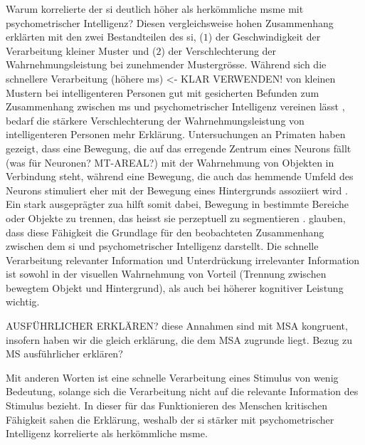 \documentclass[11pt, twoside, a4paper]{book}		%
\begin{document}
Warum korrelierte der \gls{si} deutlich höher \citep[$r~=~.64$ und $r~=~.71$;][]{Melnick2013} als herkömmliche \gls{msm}e \citep[$r~=~-.24$;][]{Sheppard2008} mit psychometrischer Intelligenz? Diesen vergleichsweise hohen Zusammenhang erklärten \citet{Melnick2013} mit den zwei Bestandteilen des \gls{si}, ($1$) der Geschwindigkeit der Verarbeitung kleiner Muster und ($2$) der Verschlechterung der Wahrnehmungsleistung bei zunehmender Mustergrösse. Während sich die schnellere Verarbeitung (höhere \gls{ms}) <- KLAR VERWENDEN! von kleinen Mustern bei intelligenteren Personen gut mit gesicherten Befunden zum Zusammenhang zwischen \gls{ms} und psychometrischer Intelligenz vereinen lässt \citep[][]{Sheppard2008}, bedarf die stärkere Verschlechterung der Wahrnehmungsleistung von intelligenteren Personen mehr Erklärung. Untersuchungen an Primaten haben gezeigt, dass eine Bewegung, die auf das erregende Zentrum eines Neurons fällt (was für Neuronen? MT-AREAL?) mit der Wahrnehmung von Objekten in Verbindung steht, während eine Bewegung, die auch das hemmende Umfeld des Neurons stimuliert eher mit der Bewegung eines Hintergrunds assoziiert wird \citep{Born2000, Churan2008, Regan2000}. Ein stark ausgeprägter \gls{zua} hilft somit dabei, Bewegung in bestimmte Bereiche oder Objekte zu trennen, das heisst sie perzeptuell zu segmentieren \citep{Braddick1993}. \citeauthor{Melnick2013} glauben, dass diese Fähigkeit die Grundlage für den beobachteten Zusammenhang zwischen dem \gls{si} und psychometrischer Intelligenz darstellt. Die schnelle Verarbeitung relevanter Information und Unterdrückung irrelevanter Information ist sowohl in der visuellen Wahrnehmung von Vorteil (Trennung zwischen bewegtem Objekt und Hintergrund), als auch bei höherer kognitiver Leistung \citep[Aufmerksamkeitslenkung auf relevante Information und Unterdrückung von Interferenzen; siehe][]{Burgess2011, Engle1999, Zanto2009} wichtig. 

AUSFÜHRLICHER ERKLÄREN? diese Annahmen sind mit MSA kongruent,
insofern haben wir die gleich erklärung, die dem MSA zugrunde liegt. 
Bezug zu MS ausführlicher erklären?

Mit anderen Worten ist eine schnelle Verarbeitung eines Stimulus von wenig Bedeutung, solange sich die Verarbeitung nicht auf die relevante Information des Stimulus bezieht. In dieser für das Funktionieren des Menschen kritischen Fähigkeit sahen \citeauthor{Melnick2013} die Erklärung, weshalb der \gls{si} stärker mit psychometrischer Intelligenz korrelierte als herkömmliche \gls{msm}e. 
\end{document}
